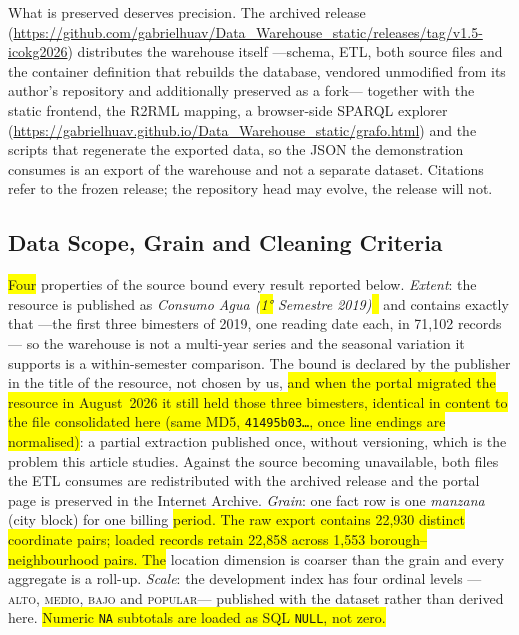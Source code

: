 \documentclass[runningheads]{llncs}
\newif\ifmarcarcambios
\newenvironment{icokgblock}{\ifmarcarcambios\color{nuevo}\fi}{}
\newcommand{\nuevo}[1]{\colorbox{yellow}{#1}}
\renewcommand{\_}{\origunderscore\allowbreak}
\begin{document}
\begin{icokgblock}
\noindent What is preserved deserves precision. The archived release
(\url{https://github.com/gabrielhuav/Data_Warehouse_static/releases/tag/v1.5-icokg2026})
distributes the warehouse itself ---schema, ETL, both source files and the
container definition that rebuilds the database, vendored unmodified from its
author's repository and additionally preserved as a fork--- together with the
static frontend, the R2RML mapping, a browser-side SPARQL explorer
(\url{https://gabrielhuav.github.io/Data_Warehouse_static/grafo.html}) and the
scripts that regenerate the exported data, so the JSON the demonstration consumes
is an export of the warehouse and not a separate dataset. Citations refer to the
frozen release; the repository head may evolve, the release will not.

\subsection{Data Scope, Grain and Cleaning Criteria}
\label{sec:grain}

\nuevo{Four} properties of the source bound every result reported below.
\emph{Extent}: the resource is published as \emph{Consumo Agua (\nuevo{1°} Semestre
2019)}\nuevo{~\cite{sacmex2026}} and contains exactly that ---the first three bimesters of 2019, one
reading date each, in 71,102 records--- so the warehouse is not a multi-year
series and the seasonal variation it supports is a within-semester comparison.
The bound is declared by the publisher in the title of the resource, not chosen
by us, \nuevo{and when the portal migrated the resource in August~2026 it still
held those three bimesters, identical in content to the file consolidated here
(same MD5, \texttt{41495b03\ldots}, once line endings are normalised)}: a partial
extraction published once, without versioning, which is the problem this article
studies. Against the source becoming unavailable, both files the ETL consumes are
redistributed with the archived release and the portal page is preserved in the
Internet Archive. \emph{Grain}: one fact row is one \emph{manzana} (city block)
for one billing \nuevo{period. The raw export contains 22,930 distinct coordinate pairs;
loaded records retain 22,858 across 1,553 borough--neighbourhood pairs. The} location dimension is
coarser than the grain and every aggregate is a roll-up. \emph{Scale}: the
development index has four ordinal levels ---\textsc{alto}, \textsc{medio},
\textsc{bajo} and \textsc{popular}--- published with the dataset rather than
derived here. \nuevo{Numeric \texttt{NA} subtotals are loaded as SQL \texttt{NULL}, not zero.}


\end{icokgblock}
\end{document}
